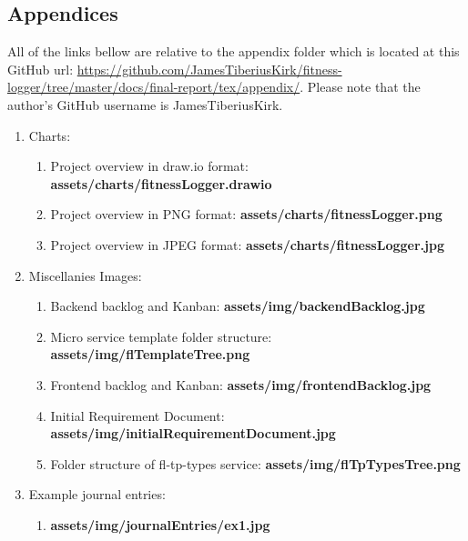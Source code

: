 \documentclass{article}
\newcommand{\vspaceconst}{-2ex}
\begin{document}
\begin{multicols}{2}
\newpage
\section*{Appendices}
\vspace{\vspaceconst}

All of the links bellow are relative to the appendix folder which is located at this GitHub url: \url{https://github.com/JamesTiberiusKirk/fitness-logger/tree/master/docs/final-report/tex/appendix/}. Please note that the author's GitHub username is JamesTiberiusKirk.
\begin{enumerate}
  \item Charts:
    \begin{enumerate}
      \item Project overview in draw.io format: \textbf{assets/charts/fitnessLogger.drawio}\\  
      \item Project overview in PNG format: \textbf{assets/charts/fitnessLogger.png}\\  
      \item Project overview in JPEG format: \textbf{assets/charts/fitnessLogger.jpg}\\
    \end{enumerate}
  \item Miscellanies Images:\\
    \begin{enumerate}
      \item Backend backlog and Kanban: \textbf{assets/img/backendBacklog.jpg}\\
      \item Micro service template folder structure: \textbf{assets/img/flTemplateTree.png}\\
      \item Frontend backlog and Kanban: \textbf{assets/img/frontendBacklog.jpg}\\
      \item Initial Requirement Document: \textbf{assets/img/initialRequirementDocument.jpg}\\
      \item Folder structure of fl-tp-types service: \textbf{assets/img/flTpTypesTree.png}\\
    \end{enumerate}
  \item Example journal entries:
    \begin{enumerate}
      \item \textbf{assets/img/journalEntries/ex1.jpg}\\

\end{enumerate}
\end{enumerate}
\end{multicols}
\end{document}
